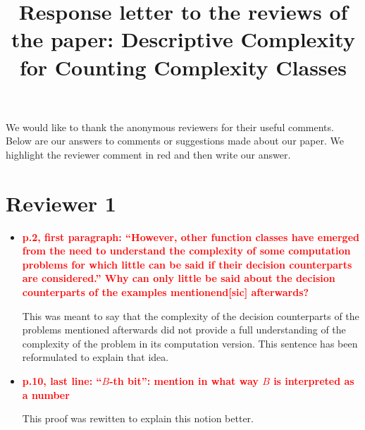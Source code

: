 \documentclass[a4paper]{article}
\newcommand{\red}[1]{{\bf\textcolor{red}{#1}}}
\begin{document}
\title{Response letter to the reviews of the paper: Descriptive Complexity for Counting Complexity Classes}

\maketitle

We would like to thank the anonymous reviewers for their useful comments.
Below are our answers to comments or suggestions made about our paper.
We highlight the reviewer comment in red and then write our answer.

\section*{Reviewer 1}

\begin{itemize}
	\setlength\itemsep{0.5em}
	\item \red{p.2, first paragraph: ``However, other function classes have emerged from the need to understand	the complexity of some computation problems for which little can be said if their decision counterparts are considered.'' Why can only little be said about the decision counterparts of the examples mentionend[sic] afterwards?}
	
	This was meant to say that the complexity of the decision counterparts of the problems mentioned afterwards did not provide a full understanding of the complexity of the problem in its computation version. This sentence has been reformulated to explain that idea.
	
	\item \red{p.10, last line: ``$B$-th bit'': mention in what way $B$ is interpreted as a number}
	
	This proof was rewitten to explain this notion better.
	

\end{itemize}
\end{document}
